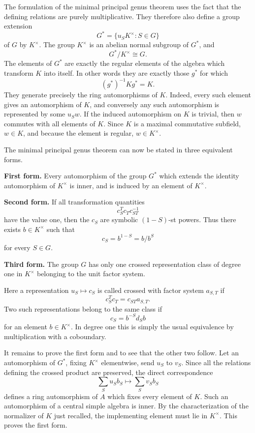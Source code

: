 \documentclass[12pt]{article}
\begin{document}
The formulation of the minimal principal genus theorem uses the fact that the defining relations are purely multiplicative. They therefore also define a group extension
\[
  G^*=\{u_S K^{\times}: S\in G\}
\]
of \(G\) by \(K^{\times}\). The group \(K^{\times}\) is an abelian normal subgroup of \(G^*\), and
\[
  G^*/K^{\times}\cong G.
\]
The elements of \(G^*\) are exactly the regular elements of the algebra which transform \(K\) into itself. In other words they are exactly those \(g^*\) for which
\[
  (g^*)^{-1}Kg^*=K.
\]
They generate precisely the ring automorphisms of \(K\). Indeed, every such element gives an automorphism of \(K\), and conversely any such automorphism is represented by some \(u_S w\). If the induced automorphism on \(K\) is trivial, then \(w\) commutes with all elements of \(K\). Since \(K\) is a maximal commutative subfield, \(w\in K\), and because the element is regular, \(w\in K^{\times}\).

The minimal principal genus theorem can now be stated in three equivalent forms.

\textbf{First form.} Every automorphism of the group \(G^*\) which extends the identity automorphism of \(K^{\times}\) is inner, and is induced by an element of \(K^{\times}\).

\textbf{Second form.} If all transformation quantities
\[
  c_S^T c_T c_{ST}^{-1}
\]
have the value one, then the \(c_S\) are symbolic \((1-S)\)-st powers. Thus there exists \(b\in K^{\times}\) such that
\[
  c_S=b^{1-S}=b/b^S
\]
for every \(S\in G\).

\textbf{Third form.} The group \(G\) has only one crossed representation class of degree one in \(K^{\times}\) belonging to the unit factor system.

Here a representation \(u_S\mapsto c_S\) is called crossed with factor system \(a_{S,T}\) if
\[
  c_S^T c_T=c_{ST}a_{S,T}.
\]
Two such representations belong to the same class if
\[
  c_S=b^{-S}d_S b
\]
for an element \(b\in K^{\times}\). In degree one this is simply the usual equivalence by multiplication with a coboundary.

It remains to prove the first form and to see that the other two follow. Let an automorphism of \(G^*\), fixing \(K^{\times}\) elementwise, send \(u_S\) to \(v_S\). Since all the relations defining the crossed product are preserved, the direct correspondence
\[
  \sum_S u_S b_S\longmapsto \sum_S v_S b_S
\]
defines a ring automorphism of \(A\) which fixes every element of \(K\). Such an automorphism of a central simple algebra is inner. By the characterization of the normalizer of \(K\) just recalled, the implementing element must lie in \(K^{\times}\). This proves the first form.
\end{document}
